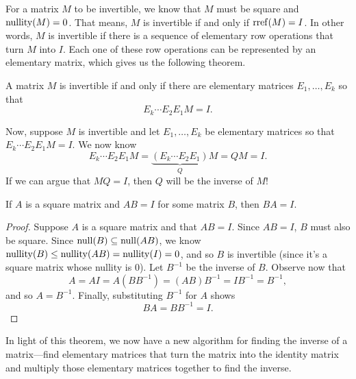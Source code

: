 For a matrix $M$ to be invertible, we know that $M$ must be square and $\operatorname{nullity}(M)=0$. That means,
$M$ is invertible if and only if $\operatorname{rref}(M)=I$. In other words, $M$ is invertible if there is a sequence of elementary row operations
that turn $M$ into $I$. Each one of these row operations can be represented by an elementary matrix, which gives us the
following theorem.

\begin{theorem}
	A matrix $M$ is invertible if and only if there are elementary matrices $E_1,\ldots, E_k$ so that
	\[
		E_k\cdots E_2E_1M=I.
	\]
\end{theorem}

Now, suppose $M$ is invertible and let $E_1,\ldots,E_k$ be elementary matrices so that $E_k\cdots E_2E_1M=I$. We now know
\[
	E_k\cdots E_2E_1M=\underbrace{(E_k\cdots E_2E_1)}_QM=QM=I.
\]
If we can argue that $MQ=I$, then $Q$ will be the inverse of $M$!

\begin{theorem}
	If $A$ is a square matrix and $AB=I$ for some matrix $B$, then
	$BA=I$.
\end{theorem}
\begin{proof}
	Suppose $A$ is a square matrix and that $AB=I$. Since $AB=I$, $B$ must also be square.
	Since $\operatorname{null}(B)\subseteq\operatorname{null}(AB)$, we know $\operatorname{nullity}(B)\leq \operatorname{nullity}(AB)=\operatorname{nullity}(I)=0$, 
	and so $B$ is invertible (since it's a square matrix whose nullity is $0$). Let $B^{-1}$
	be the inverse of $B$. Observe now that
	\[
		A=AI=A(BB^{-1})=(AB)B^{-1}=IB^{-1}=B^{-1},
	\]
	and so $A=B^{-1}$. Finally, substituting $B^{-1}$ for $A$ shows
	\[
		BA=BB^{-1}=I.
	\]
\end{proof}

In light of this theorem, we now have a new algorithm for finding the inverse of a matrix---find
elementary matrices that turn the matrix into the identity matrix and multiply those elementary
matrices together to find the inverse.

